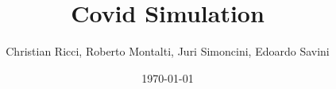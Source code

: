 
\documentclass[a4paper,12pt]{report}

\usepackage{alltt, fancyvrb, url}
\usepackage{graphicx}
\usepackage[utf8]{inputenc}
\usepackage{hyperref}
\usepackage[italian]{babel}
\usepackage[italian]{cleveref}

\title{Covid Simulation}

\author{Christian Ricci, Roberto Montalti, Juri Simoncini, Edoardo Savini}
\date{\today}



\maketitle

\tableofcontents

\chapter{Analisi}

Il team si pone come obbiettivo lo sviluppo di una simulazione del Covid dentro l'università di Bologna. Lo scopo è poter permettere all'utente di visualizzare una possibile diffusione del Covid dentro l'università, attraverso una mappa virtuale della struttura. L'utente potrà inoltre modificare alcuni parametri della simulazione, per esempio potrà aggiungere nuove persone mentre la simulazione sta girando.

\section{Requisiti}

